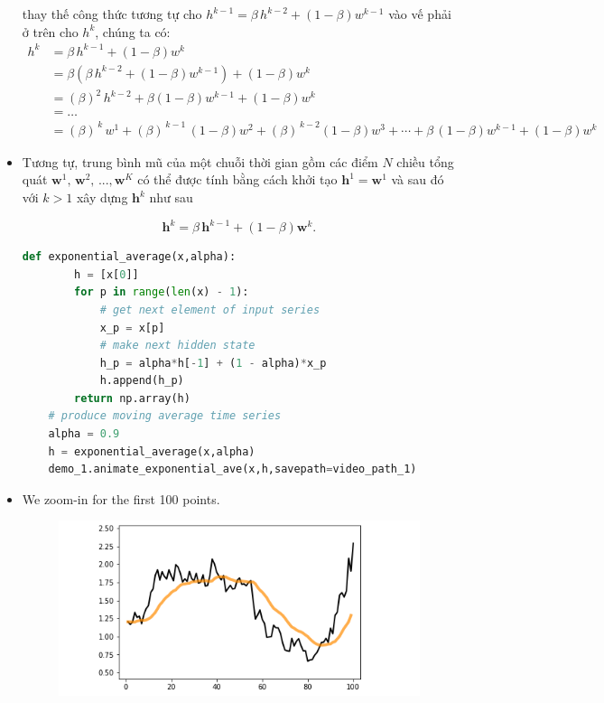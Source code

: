 \documentclass{book}
\begin{document}
\begin{itemize}
    thay thế công thức tương tự cho $h^{k-1} = \beta \, h^{k-2} +  \left(1 - \beta\right)w^{k-1}$ vào vế phải ở trên cho $h^k$, chúng ta có:
    \begin{equation*}
        \begin{aligned}
            h^k &= \beta \, h^{k-1} +  \left(1 - \beta\right)w^k \\
            &= \beta\left(\beta\, h^{k-2} + \left(1 - \beta\right)w^{k-1}\right) + \left(1 - \beta\right) w^k\\
            &= \left(\beta\right)^2 \, h^{k-2} + \beta  \left(1 - \beta\right)w^{k-1} + \left(1 - \beta\right) w^k\\
            &= \ldots\\
            &= \left(\beta\right)^{\,k} \, w^1 + \left(\beta\right)^{\,k-1}\,\left(1 - \beta\right) w^{2} + \left(\beta\right)^{\,k-2}\left(1 - \beta\right)w^3 + \cdots  + \beta\,\left(1 - \beta\right)w^{k-1}  + \left(1 - \beta\right)w^k 
        \end{aligned}
    \end{equation*}
    \item Tương tự, trung bình mũ của một chuỗi thời gian gồm các điểm $N$ chiều tổng quát $\mathbf{w}^1,\,\mathbf{w}^2,\,...,\mathbf{w}^K$ có thể được tính bằng cách khởi tạo $\mathbf{h}^1 = \mathbf{w}^1$ và sau đó với $k > 1$ xây dựng $\mathbf{h}^k$ như sau

    \begin{equation*}
        \mathbf{h}^{k} = \beta \, \mathbf{h}^{k-1} +  \left(1 - \beta\right)\mathbf{w}^k.
    \end{equation*}
    \begin{lstlisting}[language=Python, caption={Đoạn mã Python để vẽ đồ thị với trung bình mũ (exponential average).}, label={code:matplotlib_plot}]
    def exponential_average(x,alpha):
        h = [x[0]]
        for p in range(len(x) - 1):
            # get next element of input series
            x_p = x[p]        
            # make next hidden state
            h_p = alpha*h[-1] + (1 - alpha)*x_p
            h.append(h_p)
        return np.array(h)
    # produce moving average time series
    alpha = 0.9
    h = exponential_average(x,alpha)
    demo_1.animate_exponential_ave(x,h,savepath=video_path_1)
    \end{lstlisting}
    \item We zoom-in for the first 100 points.
    \begin{figure}[H]
        \centering
        \includegraphics[width=\textwidth]{images/exponential_average_zoom_in.png}
    \end{figure}
\end{itemize}
\end{document}
